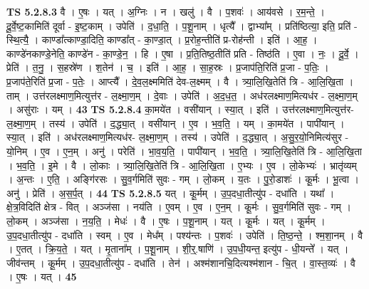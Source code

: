 \documentclass[17pt]{extarticle}
\begin{document}
                  \newline
                                \textbf{ TS 5.2.8.3} \newline
                  वै । ए॒षः । यत् । अ॒ग्निः । न । खलु॑ । वै । प॒शवः॑ । आय॑वसे । र॒म॒न्ते॒ । दू॒र्वे॒ष्ट॒कामिति॑ दूर्वा - इ॒ष्ट॒काम् । उपेति॑ । द॒धा॒ति॒ । प॒शू॒नाम् । धृत्यै᳚ । द्वाभ्या᳚म् । प्रति॑ष्ठित्या॒ इति॒ प्रति॑ - स्थि॒त्यै॒ । काण्डा᳚त्काण्डा॒दिति॒ काण्डा᳚त् - का॒ण्डा॒त् । प्र॒रोह॒न्तीति॑ प्र-रोह॑न्ती । इति॑ । आ॒ह॒ । काण्डे॑नकाण्डे॒नेति॒ काण्डे॑न - का॒ण्डे॒न॒ । हि । ए॒षा । प्र॒ति॒तिष्ठ॒तीति॑ प्रति - तिष्ठ॑ति । ए॒वा । नः॒ । दू॒र्वे॒ । प्रेति॑ । त॒नु॒ । स॒हस्रे॑ण । श॒तेन॑ । च॒ । इति॑ । आ॒ह॒ । सा॒ह॒स्रः । प्र॒जाप॑ति॒रिति॑ प्र॒जा - प॒तिः॒ । प्र॒जाप॑ते॒रिति॑ प्र॒जा - प॒तेः॒ । आप्त्यै᳚ । दे॒व॒ल॒क्ष्ममिति॑ देव-ल॒क्ष्मम् । वै । त्र्या॒लि॒खि॒तेति॑ त्रि - आ॒लि॒खि॒ता । ताम् । उत्त॑रलक्ष्माण॒मित्युत्त॑र - ल॒क्ष्मा॒ण॒म् । दे॒वाः । उपेति॑ । अ॒द॒ध॒त॒ । अध॑रलक्ष्माण॒मित्यध॑र - ल॒क्ष्मा॒ण॒म् । असु॑राः । यम् । \textbf{  43} \newline
                  \newline
                                \textbf{ TS 5.2.8.4} \newline
                  का॒मये॑त । वसी॑यान् । स्या॒त् । इति॑ । उत्त॑रलक्ष्माण॒मित्युत्त॑र-ल॒क्ष्मा॒ण॒म् । तस्य॑ । उपेति॑ । द॒द्ध्या॒त् । वसी॑यान् । ए॒व । भ॒व॒ति॒ । यम् । का॒मये॑त । पापी॑यान् । स्या॒त् । इति॑ । अध॑रलक्ष्माण॒मित्यध॑र- ल॒क्ष्मा॒ण॒म् । तस्य॑ । उपेति॑ । द॒द्ध्या॒त् । अ॒सु॒र॒यो॒निमित्य॑सुर - यो॒निम् । ए॒व । ए॒न॒म् । अनु॑ । परेति॑ । भा॒व॒य॒ति॒ । पापी॑यान् । भ॒व॒ति॒ । त्र्या॒लि॒खि॒तेति॑ त्रि - आ॒लि॒खि॒ता । भ॒व॒ति॒ । इ॒मे । वै । लो॒काः । त्र्या॒लि॒खि॒तेति॑ त्रि - आ॒लि॒खि॒ता । ए॒भ्यः । ए॒व । लो॒केभ्यः॑ । भ्रातृ॑व्यम् । अ॒न्तः । ए॒ति॒ । अङ्गि॑रसः । सु॒व॒र्गमिति॑ सुवः - गम् । लो॒कम् । य॒तः । पु॒रो॒डाशः॑ । कू॒र्मः । भू॒त्वा । अनु॑ । प्रेति॑ । अ॒स॒र्प॒त् । \textbf{  44} \newline
                  \newline
                                \textbf{ TS 5.2.8.5} \newline
                  यत् । कू॒र्मम् । उ॒प॒दधा॒तीत्यु॑प - दधा॑ति । यथा᳚ । क्षे॒त्र॒विदिति॑ क्षेत्र - वित् । अञ्ज॑सा । नय॑ति । ए॒वम् । ए॒व । ए॒न॒म् । कू॒र्मः । सु॒व॒र्गमिति॑ सुवः - गम् । लो॒कम् । अञ्ज॑सा । न॒य॒ति॒ । मेधः॑ । वै । ए॒षः । प॒शू॒नाम् । यत् । कू॒र्मः । यत् । कू॒र्मम् । उ॒प॒दधा॒तीत्यु॑प - दधा॑ति । स्वम् । ए॒व । मेध᳚म् । पश्य॑न्तः । प॒शवः॑ । उपेति॑ । ति॒ष्ठ॒न्ते॒ । श्म॒शा॒नम् । वै । ए॒तत् । क्रि॒य॒ते॒ । यत् । मृ॒ताना᳚म् । प॒शू॒नाम् । शी॒र्॒.षाणि॑ । उ॒प॒धी॒यन्त॒ इत्यु॑प - धी॒यन्ते᳚ । यत् । जीव॑न्तम् । कू॒र्मम् । उ॒प॒दधा॒तीत्यु॑प - दधा॑ति । तेन॑ । अश्म॑शानचि॒दित्यश्म॑शान - चि॒त् । वा॒स्त॒व्यः॑ । वै । ए॒षः । यत् । \textbf{  45} \newline
\end{document}
